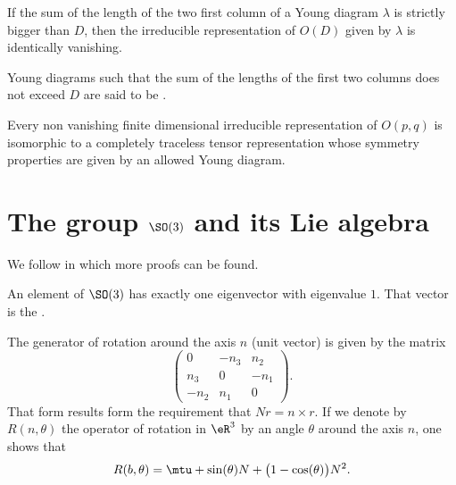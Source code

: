 \begin{theorem}
If the sum of the length of the two first column of a Young diagram $\lambda$ is strictly bigger than $D$, then the irreducible representation of $O(D)$ given by $\lambda$ is identically vanishing.
\end{theorem}

Young diagrams such that the sum of the lengths of the first two columns does not exceed $D$ are said to be .

\begin{theorem}		\label{ThoOpqrepreTens}
Every non vanishing finite dimensional irreducible representation of $O(p,q)$ is isomorphic to a completely traceless tensor representation whose symmetry properties are given by an allowed Young diagram.
\end{theorem}
					\section{The group \texorpdfstring{$\SO(3)$}{SO3} and its Lie algebra}
\label{SubSecTheGroupSotrois}

We follow \cite{WormerAngular} in which more proofs can be found.

\begin{proposition}
An element of $\SO(3)$ has exactly one eigenvector with eigenvalue $1$. That vector is the .
\end{proposition}

The generator of rotation around the axis $n$ (unit vector) is given by the matrix
\begin{equation}
\begin{pmatrix}
  0	&	-n_3	&	n_2\\ 
  n_3	&	0	&	-n_1\\ 
 -n_2	&	n_1	& 0	  
\end{pmatrix}.
\end{equation}
That form results form the requirement that $Nr=n\times r$. If we denote by $R(n,\theta)$ the operator of rotation in $\eR^3$ by an angle $\theta$ around the axis $n$, one shows that
\begin{equation}
	R(b,\theta)=\mtu+\sin(\theta) N+\big(1-\cos(\theta)\big)N^2.
\end{equation}

